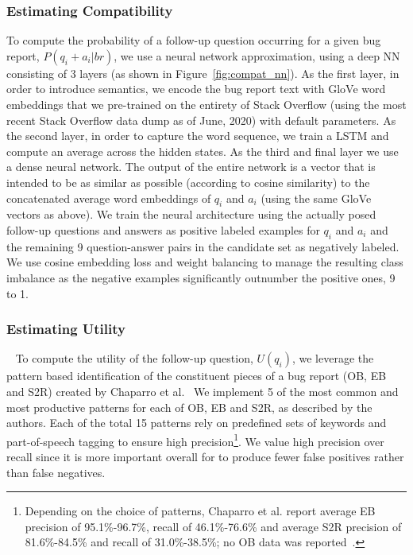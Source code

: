 \subsubsection{Estimating Compatibility}
To compute the probability of a follow-up question occurring for a given bug report, $P(q_{i}+a_{i}|br)$, we use a neural
network approximation, using a deep NN consisting of 3 layers (as shown in Figure~\ref{fig:compat_nn}). As the first layer,
in order to introduce semantics, we encode the bug report text with GloVe word embeddings that we pre-trained on the entirety of Stack Overflow (using the most recent Stack Overflow data dump as of June, 2020) with default parameters. As the second layer, in order to capture the word sequence, we train a LSTM and compute an average across the hidden states. As the third and final layer we use a dense neural network. The output of the entire network is a vector that is intended to be as similar as possible (according to cosine similarity) to the concatenated average word embeddings of $q_{i}$ and $a_{i}$ (using the same GloVe vectors as above). We train the neural architecture using the actually posed follow-up questions and answers as positive labeled examples for $q_{i}$ and $a_{i}$ and the remaining 9 question-answer pairs in the candidate set as negatively labeled. We use cosine embedding loss and weight balancing to manage the resulting class imbalance as the negative examples significantly outnumber the positive ones, 9 to 1.

\subsubsection{Estimating Utility}~\label{sec:estimate_util}
To compute the utility of the follow-up question, $U(q_{i})$, we leverage the pattern based
identification of the constituent pieces of a bug report (OB, EB and S2R) created by Chaparro 
et al.~\cite{chaparro17detecting}
We implement 5 of the most common and most productive patterns for each of OB, EB and S2R, as described by
the authors. Each of the total 15 patterns rely on predefined sets of keywords and part-of-speech tagging to ensure high
precision\footnote{Depending on the choice of patterns, Chaparro et al. report average EB precision of 95.1\%-96.7\%, recall of 46.1\%-76.6\% and average S2R precision of 81.6\%-84.5\% and recall of 31.0\%-38.5\%; no OB data was reported~\cite{chaparro17detecting}.}. We value high precision over recall since it is more important overall for \evpi to produce fewer false positives rather than false negatives.

